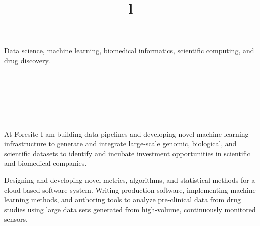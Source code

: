 \begin{resume}



\section{}
Data science, machine learning, biomedical informatics, scientific computing, and drug discovery.


\section{}
\begin{format}
  \\
  \title{l}\\
  \body\\
\end{format}


\title{\small{}}
\begin{position}
At Foresite I am building data pipelines and developing novel machine learning infrastructure to generate and integrate large-scale genomic, biological, and scientific datasets to identify and incubate investment opportunities in scientific and biomedical companies.
\end{position}

\vspace{-0.5em}

\title{\small{}}
\begin{position}
Designing and developing novel metrics, algorithms, and statistical methods for a cloud-based software system.  Writing production software, implementing machine learning methods, and authoring tools to analyze pre-clinical data from drug studies using large data sets generated from high-volume, continuously monitored sensors.
\end{position}


\end{resume}
